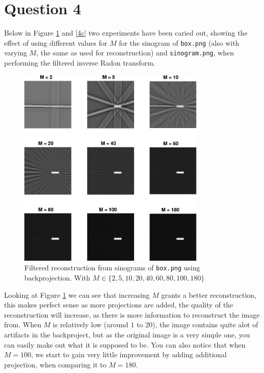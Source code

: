 \documentclass[a4paper]{article}
\begin{document}
\section*{Question 4}
Below in Figure \ref{4b} and \ref{4c} two experiments have been caried out, showing the effect of using different values for $M$ for the sinogram of \texttt{box.png} (also with varying $M$, the same as used for reconstruction) and \texttt{sinogram.png}, when performing the filtered inverse Radon transform.
\begin{figure}[H]
  \centering
  \includegraphics[width=0.8\textwidth]{./4b.pdf}
  \caption{Filtered reconstruction from sinograms of \texttt{box.png} using backprojection. With $M \in \{2,5,10,20,40,60,80,100,180\}$}
  \label{4b}
\end{figure}
Looking at Figure \ref{4b} we can see that increasing $M$ grants a better reconstruction, this makes perfect sense as more projections are added, the quality of the reconstruction will increase, as there is more information to reconstruct the image from. When $M$ is relatively low (around $1$ to $20$), the image contains quite alot of artifacts in the backproject, but as the original image is a very simple one, you can easily make out what it is supposed to be. You can also notice that when
$M=100$, we start to gain very little improvement by adding additional projection, when comparing it to $M=180$.
\end{document}
